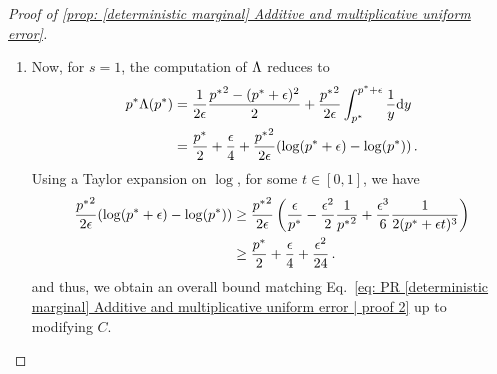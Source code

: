 \begin{proof}[{Proof of \cref{prop: [deterministic marginal] Additive and multiplicative uniform error}}]
\begin{enumerate}
  \item Now, for $s=1$, the computation of $\Lambda$ reduces to
  \begin{align*}
      p^*\Lambda(p^*)&=\frac1{2\epsilon}\frac{{p^*}^2-(p^*+\epsilon)^2}{2} + \frac{{p^*}^2}{2\epsilon}\int_{p^*}^{p^*+\epsilon} \frac1{y}\mathrm{d}y\\
      &=\frac{p^*}2 + \frac{\epsilon}{4} + \frac{{p^*}^2}{2\epsilon}(\log(p^*+\epsilon)-\log(p^*))\,.
  \end{align*}
    Using a Taylor expansion on $\log$, for some $t\in[0,1]$, we have 
    \begin{align*}
            \frac{{p^*}^2}{2\epsilon}(\log(p^*+\epsilon)-\log(p^*))&\ge \frac{{p^*}^2}{2\epsilon}\left(\frac{\epsilon}{p^*}-\frac{\epsilon^2}2\frac{1}{{p^*}^2} + \frac{\epsilon^3}{6}\frac{1}{2(p^*+\epsilon t)^3}\right)\\
            &\ge \frac{p^*}2 + \frac{\epsilon}4 + \frac{\epsilon^2}{24}\,.
    \end{align*}
    and thus, we obtain an overall bound matching Eq.~\eqref{eq: PR [deterministic marginal] Additive and multiplicative uniform error | proof 2} up to modifying $C$.\qedhere
\end{enumerate}

\end{proof}
